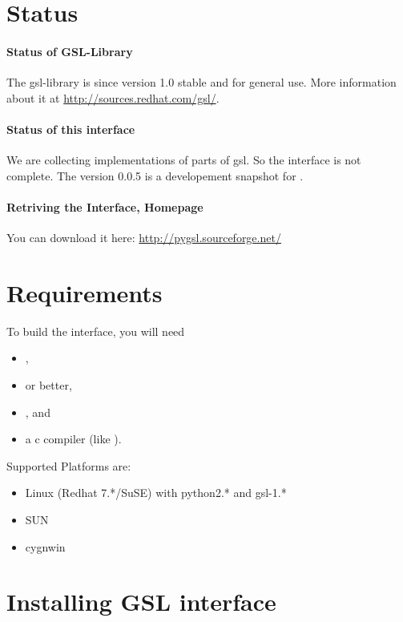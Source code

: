 \section{Status}

\paragraph*{Status of GSL-Library}
The gsl-library is since version 1.0 stable and for general use.
More information about it at \url{http://sources.redhat.com/gsl/}.

\paragraph*{Status of this interface}
We are collecting implementations of parts of gsl.
So the interface is not complete.
The version 0.0.5 is a developement snapshot for .

\paragraph*{Retriving the Interface, Homepage}
You can download it here: \url{http://pygsl.sourceforge.net/}

\section{Requirements}

To build the interface, you will need
\begin{itemize}
\item {},
\item {} or better,
\item {}, and
\item a c compiler (like ).
\end{itemize}

Supported Platforms are:
\begin{itemize}
\item Linux (Redhat 7.*/SuSE) with python2.* and gsl-1.*
\item SUN
\item cygnwin
\end{itemize}

\section{Installing GSL interface}

